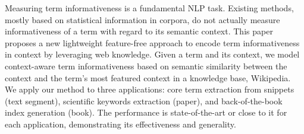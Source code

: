 Measuring term informativeness is a fundamental NLP task. Existing methods, mostly based on statistical information in corpora, do not actually measure
 informativeness of a term with regard to its semantic context. This paper
 proposes a new lightweight feature-free approach to encode term informativeness
 in context by leveraging web knowledge. Given a term and its context, we model
 context-aware term informativeness based on semantic similarity between the
 context and the term's most featured context in a knowledge base, Wikipedia. We
 apply our method to three applications: core term extraction from snippets
 (text segment), scientific keywords extraction (paper), and back-of-the-book
 index generation (book). The performance is state-of-the-art or close to it for
 each application, demonstrating its effectiveness and generality.

